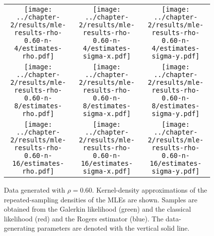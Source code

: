 \begin{figure}
  \centering
  \begin{tabular}{ccc}
    \begin{minipage}{0.3\textwidth}
      \centering
      \texttt{[image: ../chapter-2/results/mle-results-rho-0.60-n-4/estimates-rho.pdf]}
    \end{minipage}
    & \begin{minipage}{0.3\textwidth}
      \centering
      \texttt{[image: ../chapter-2/results/mle-results-rho-0.60-n-4/estimates-sigma-x.pdf]}
    \end{minipage}
    & \begin{minipage}{0.3\textwidth}
      \centering
      \texttt{[image: ../chapter-2/results/mle-results-rho-0.60-n-4/estimates-sigma-y.pdf]}
    \end{minipage} \\
    \begin{minipage}{0.3\textwidth}
      \centering
      \texttt{[image: ../chapter-2/results/mle-results-rho-0.60-n-8/estimates-rho.pdf]}
    \end{minipage}
    & \begin{minipage}{0.3\textwidth}
      \centering
      \texttt{[image: ../chapter-2/results/mle-results-rho-0.60-n-8/estimates-sigma-x.pdf]}
    \end{minipage}
    & \begin{minipage}{0.3\textwidth}
      \centering
      \texttt{[image: ../chapter-2/results/mle-results-rho-0.60-n-8/estimates-sigma-y.pdf]}
    \end{minipage} \\
    \begin{minipage}{0.3\textwidth}
      \centering
      \texttt{[image: ../chapter-2/results/mle-results-rho-0.60-n-16/estimates-rho.pdf]}
    \end{minipage}
    & \begin{minipage}{0.3\textwidth}
      \centering
      \texttt{[image: ../chapter-2/results/mle-results-rho-0.60-n-16/estimates-sigma-x.pdf]}
    \end{minipage}
    & \begin{minipage}{0.3\textwidth}
      \centering
      \texttt{[image: ../chapter-2/results/mle-results-rho-0.60-n-16/estimates-sigma-y.pdf]}
    \end{minipage}
  \end{tabular}
  \caption{Data generated with $\rho=0.60$. Kernel-density
    approximations of the repeated-sampling densities of the MLEs are
    shown.  Samples are obtained from the Galerkin likelihood (green)
    and the classical likelihood (red) and the Rogers estimator
    (blue). The data-generating parameters are denoted with the
    vertical solid line.}
  \label{fig:mle-comparison-rho-0.60}
\end{figure}


